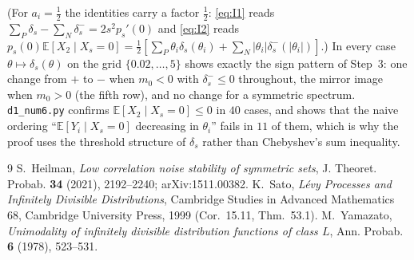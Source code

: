 \documentclass[11pt]{article}
\theoremstyle{remark}
\newcommand{\E}{\mathbb{E}}
\begin{document}
(For $a_i=\frac12$ the identities carry a factor $\frac12$: \eqref{eq:I1} reads $\sum_P\delta_s-\sum_N\delta_s^-=2s^2p_s'(0)$ and
\eqref{eq:I2} reads $p_s(0)\E[X_2\mid X_s=0]=\frac12[\sum_P\theta_i\delta_s(\theta_i)+\sum_N|\theta_i|\delta_s^-(|\theta_i|)]$.)
In every case $\theta\mapsto\delta_s(\theta)$ on the grid $\{0.02,\dots,5\}$ shows exactly the sign pattern of Step~3: one change from $+$ to $-$
when $m_0<0$ with $\delta_s^-\le0$ throughout, the mirror image when $m_0>0$ (the fifth row), and no change for a symmetric spectrum.
\texttt{d1\_num6.py} confirms $\E[X_2\mid X_s=0]\le0$ in $40$ cases, and shows that the naive ordering ``$\E[Y_i\mid X_s=0]$ decreasing in
$\theta_i$'' fails in $11$ of them, which is why the proof uses the threshold structure of $\delta_s$ rather than Chebyshev's sum inequality.

\begin{thebibliography}{9}
 S.~Heilman, \emph{Low correlation noise stability of symmetric sets}, J. Theoret. Probab. \textbf{34} (2021), 2192--2240; arXiv:1511.00382.
 K.~Sato, \emph{L\'evy Processes and Infinitely Divisible Distributions}, Cambridge Studies in Advanced Mathematics 68, Cambridge University Press, 1999 (Cor.~15.11, Thm.~53.1).
 M.~Yamazato, \emph{Unimodality of infinitely divisible distribution functions of class $L$}, Ann. Probab. \textbf{6} (1978), 523--531.
\end{thebibliography}
\end{document}
